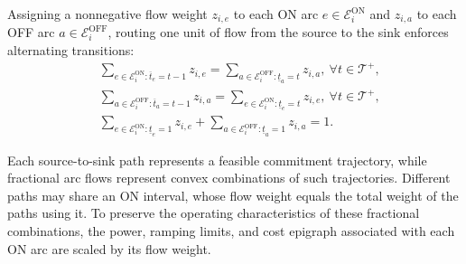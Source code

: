 \documentclass[journal]{IEEEtran}
\begin{document}
Assigning a nonnegative flow weight $z_{i,e}$ to each ON arc $e\in\mathcal{E}_i^{\mathrm{ON}}$ and $z_{i,a}$ to each OFF arc $a\in\mathcal{E}_i^{\mathrm{OFF}}$, routing one unit of flow from the source to the sink enforces alternating transitions:
\begin{subequations}\label{eq:flow}
\begin{align}
&\sum\nolimits_{e\in\mathcal{E}_i^{\mathrm{ON}}:\overline{t}_e=t-1} z_{i,e} \!=\! \sum\nolimits_{a\in\mathcal{E}_i^{\mathrm{OFF}}:\underline{t}_a=t} z_{i,a}, \ \forall t\!\!\in\!\!\mathcal{T}^{+},\label{eq:flow-on-off}\\
&\sum\nolimits_{a\in\mathcal{E}_i^{\mathrm{OFF}}:\overline{t}_a=t-1} z_{i,a} \!=\! \sum\nolimits_{e\in\mathcal{E}_i^{\mathrm{ON}}:\underline{t}_e=t} z_{i,e}, \ \forall t\!\!\in\!\!\mathcal{T}^{+},\label{eq:flow-off-on}\\
&\sum\nolimits_{e\in\mathcal{E}_i^{\mathrm{ON}}:\underline{t}_e=1} z_{i,e} + \sum\nolimits_{a\in\mathcal{E}_i^{\mathrm{OFF}}:\underline{t}_a=1} z_{i,a} = 1.\label{eq:flow-source}
\end{align}
\end{subequations}

Each source-to-sink path represents a feasible commitment trajectory, while fractional arc flows represent convex combinations of such trajectories. Different paths may share an ON interval, whose flow weight equals the total weight of the paths using it. To preserve the operating characteristics of these fractional combinations, the power, ramping limits, and cost epigraph associated with each ON arc are scaled by its flow weight.
\end{document}
